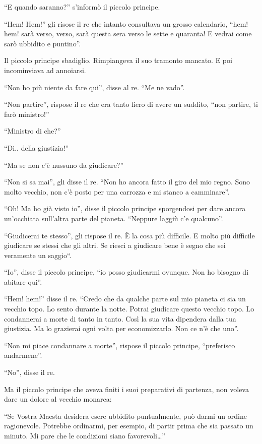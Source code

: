 \documentclass[11pt]{scrbook}
\begin{document}
``E quando saranno?'' s'informò il piccolo principe.

``Hem! Hem!'' gli risose il re che intanto consultava un grosso
calendario, ``hem! hem! sarà verso, verso, sarà questa sera verso le
sette e quaranta! E vedrai come sarò ubbidito e puntino''.

Il piccolo principe sbadiglio. Rimpiangeva il suo tramonto mancato. E
poi incominviava ad annoiarsi.

``Non ho più niente da fare qui'', disse al re. ``Me ne vado''.

``Non partire'', rispose il re che era tanto fiero di avere un suddito,
``non partire, ti farò ministro!''

``Ministro di che?''

``Di.. della giustizia!''

``Ma se non c'è nussuno da giudicare?''

``Non si sa mai'', gli disse il re. ``Non ho ancora fatto il giro del
mio regno. Sono molto vecchio, non c'è posto per una carrozza e mi stanco
a camminare''.

``Oh! Ma ho già visto io'', disse il piccolo principe sporgendosi per
dare ancora un'occhiata sull'altra parte del pianeta. ``Neppure laggiù
c'e qualcuno''.

``Giudicerai te stesso'', gli rispose il re. È la cosa più difficile. E
molto più difficile giudicare se stessi che gli altri. Se riesci a
giudicare bene è segno che sei veramente un saggio``.

``Io'', disse il piccolo principe, ``io posso giudicarmi ovunque. Non ho
bisogno di abitare qui''.

``Hem! hem!'' disse il re. ``Credo che da qualche parte sul mio pianeta
ci sia un vecchio topo. Lo sento durante la notte. Potrai giudicare
questo vecchio topo. Lo condannerai a morte di tanto in tanto. Così la
sua vita dipendera dalla tua giustizia. Ma lo grazierai ogni volta per
economizzarlo. Non ce n'è che uno''.

``Non mi piace condannare a morte'', rispose il piccolo principe,
``preferisco andarmene''.

``No'', disse il re.

Ma il piccolo principe che aveva finiti i suoi preparativi di partenza,
non voleva dare un dolore al vecchio monarca:

``Se Vostra Maesta desidera esere ubbidito puntualmente, può darmi un
ordine ragionevole. Potrebbe ordinarmi, per esempio, di partir prima che
sia passato un minuto. Mi pare che le condizioni siano
favorevoli\ldots{}''
\end{document}

